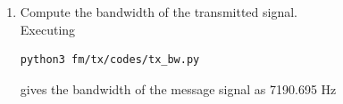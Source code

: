\begin{enumerate}[label=\arabic*.,ref=\thesection.\theenumi]
\item Compute the bandwidth of the transmitted signal.
\\
\solution
Executing
\begin{lstlisting}
python3 fm/tx/codes/tx_bw.py
\end{lstlisting}
gives the bandwidth of the message signal as 7190.695 Hz

\end{enumerate}
